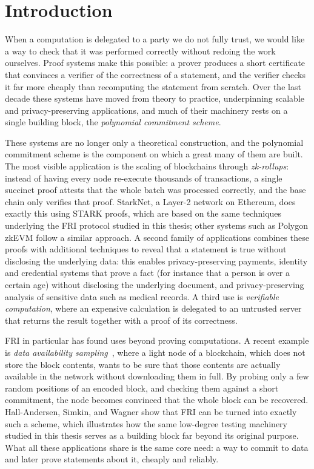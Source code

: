 \chapter{Introduction}
\label{ch:introduction}

When a computation is delegated to a party we do not fully trust, we
would like a way to check that it was performed correctly without
redoing the work ourselves. Proof systems make this possible: a prover
produces a short certificate that convinces a verifier of the
correctness of a statement, and the verifier checks it far more cheaply
than recomputing the statement from scratch. Over the last decade these
systems have moved from theory to practice, underpinning scalable and
privacy-preserving applications, and much of their machinery rests on a
single building block, the \emph{polynomial commitment scheme}.

These systems are no longer only a theoretical construction, and the
polynomial commitment scheme is the component on which a great many of
them are built. The most visible application is the scaling of
blockchains through \emph{zk-rollups}: instead of having every node
re-execute thousands of transactions, a single succinct proof attests
that the whole batch was processed correctly, and the base chain only
verifies that proof. StarkNet, a Layer-2 network on Ethereum, does exactly
this using STARK proofs, which are based on the same techniques underlying
the FRI protocol studied in this thesis; other systems such as Polygon 
zkEVM follow a similar approach. A second family of applications combines 
these proofs with additional techniques to reveal that a statement is true 
without disclosing the underlying data: this enables privacy-preserving payments,
identity and credential systems that prove a fact (for instance that a
person is over a certain age) without disclosing the underlying document,
and privacy-preserving analysis of sensitive data such as medical
records. A third use is \emph{verifiable computation}, where an
expensive calculation is delegated to an untrusted server that returns
the result together with a proof of its correctness.

FRI in particular has found uses beyond proving computations. A recent
example is \emph{data availability sampling}~\cite{FRIDA}, where a light
node of a blockchain, which does not store the block contents, wants to
be sure that those contents are actually available in the network
without downloading them in full. By probing only a few random positions
of an encoded block, and checking them against a short commitment, the
node becomes convinced that the whole block can be recovered. Hall-Andersen,
Simkin, and Wagner show that FRI can be turned into exactly such a
scheme, which illustrates how the same low-degree testing machinery
studied in this thesis serves as a building block far beyond its original
purpose. What all these applications share is the same core need: a way
to commit to data and later prove statements about it, cheaply and
reliably.

